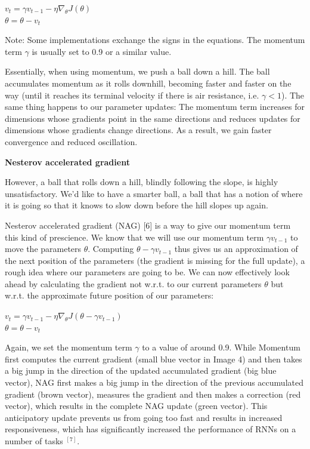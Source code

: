 \documentclass[4pt,journal,compsoc]{IEEEtran}
\begin{document}
\begin{flushleft}
    $v_t = \gamma v_{t-1} - \eta \nabla _ \theta J(\theta)$ \\
    $\theta = \theta - v_t$ \newline
    
    Note: Some implementations exchange the signs in the equations. The momentum term $\gamma$ is usually set to 0.9 or a similar value.\newline
    
    Essentially, when using momentum, we push a ball down a hill. The ball accumulates momentum as it rolls downhill, becoming faster and faster on the way (until it reaches its terminal velocity if there is air resistance, i.e. $\gamma < 1$). The same thing happens to our parameter updates: The momentum term increases for dimensions whose gradients point in the same directions and reduces updates for dimensions whose gradients change directions. As a result, we gain faster convergence and reduced oscillation. \newline \newline
    
    \textbf{\Large Nesterov accelerated gradient} \newline
    
   However, a ball that rolls down a hill, blindly following the slope, is highly unsatisfactory. We'd like to have a smarter ball, a ball that has a notion of where it is going so that it knows to slow down before the hill slopes up again. \newline
   
   Nesterov accelerated gradient (NAG) [6] is a way to give our momentum term this kind of prescience. We know that we will use our momentum term $\gamma v_{t - 1}$ to move the parameters $\theta$. Computing $\theta - \gamma v_{t - 1}$ thus gives us an approximation of the next position of the parameters (the gradient is missing for the full update), a rough idea where our parameters are going to be. We can now effectively look ahead by calculating the gradient not w.r.t. to our current parameters $\theta$ but w.r.t. the approximate future position of our parameters: \newline
   
   $v_t = \gamma v_{t-1} - \eta \nabla _ \theta J(\theta - \gamma v_{t-1})$ \\
    $\theta = \theta - v_t$ \newline
    
    Again, we set the momentum term $\gamma$ to a value of around 0.9. While Momentum first computes the current gradient (small blue vector in Image 4) and then takes a big jump in the direction of the updated accumulated gradient (big blue vector), NAG first makes a big jump in the direction of the previous accumulated gradient (brown vector), measures the gradient and then makes a correction (red vector), which results in the complete NAG update (green vector). This anticipatory update prevents us from going too fast and results in increased responsiveness, which has significantly increased the performance of RNNs on a number of tasks $ ^ {[7]}$. \newline
    

\end{flushleft}
\end{document}
